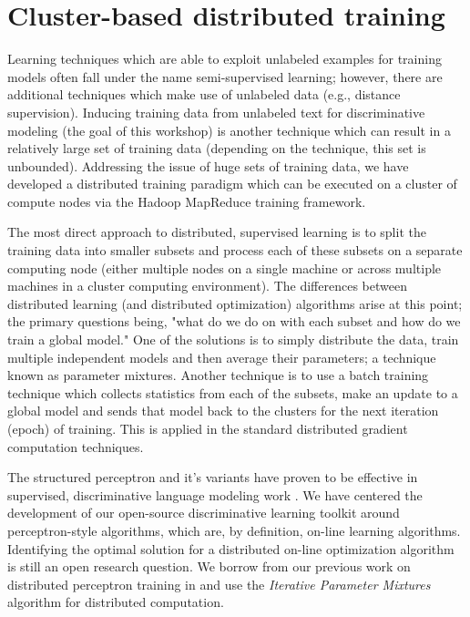 \documentclass[a4paper]{article}
\let\textquotedbl="
\begin{document}
\section{Cluster-based distributed training}

Learning techniques which are able to exploit unlabeled examples for
training models often fall under the name semi-supervised learning;
however, there are additional techniques which make use of unlabeled
data (e.g., distance supervision\cite{mintz09}). Inducing training
data from unlabeled text for discriminative modeling (the goal of
this workshop) is another technique which can result in a relatively
large set of training data (depending on the technique, this set is
unbounded). Addressing the issue of huge sets of training data, we
have developed a distributed training paradigm which can be executed
on a cluster of compute nodes via the Hadoop MapReduce training framework.

The most direct approach to distributed, supervised learning is to
split the training data into smaller subsets and process each of these
subsets on a separate computing node (either multiple nodes on a single
machine or across multiple machines in a cluster computing environment).
The differences between distributed learning (and distributed optimization)
algorithms arise at this point; the primary questions being, \textquotedbl{}what
do we do on with each subset and how do we train a global model.\textquotedbl{}
One of the solutions is to simply distribute the data, train multiple
independent models and then average their parameters; a technique known
as parameter mixtures. Another technique is to use a batch training
technique which collects statistics from each of the subsets, make
an update to a global model and sends that model back to the clusters
for the next iteration (epoch) of training. This is applied in the
standard distributed gradient computation techniques.

The structured perceptron \cite{Collins02b} and it's variants have proven to
be effective in supervised, discriminative language modeling work
\cite{Roark07}.  We have centered the development of 
our open-source discriminative learning toolkit around perceptron-style
algorithms, which are, by definition, on-line learning algorithms. Identifying the
optimal solution for a distributed on-line optimization algorithm is still an open
research question. We borrow from our previous work on distributed perceptron
training in \cite{mcdonald10distributed} and use the \emph{Iterative Parameter
Mixtures} algorithm for distributed computation.
\end{document}
